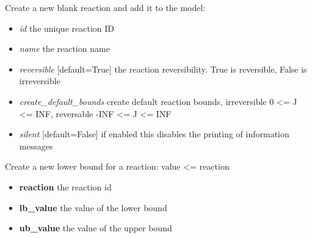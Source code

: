 \documentclass[a4paper,11pt,english]{sphinxmanual}
\begin{document}
\begin{fulllineitems}
\begin{fulllineitems}
\end{fulllineitems}


\begin{fulllineitems}
\label{modules_doc:cbmpy.CBModel.Model.createReaction}
Create a new blank reaction and add it to the model:
\begin{itemize}
\item {} 
\emph{id} the unique reaction ID

\item {} 
\emph{name} the reaction name

\item {} 
\emph{reversible} {[}default=True{]} the reaction reversibility. True is reversible, False is irreversible

\item {} 
\emph{create\_default\_bounds} create default reaction bounds, irreversible 0 \textless{}= J \textless{}= INF, reversable -INF \textless{}= J \textless{}= INF

\item {} 
\emph{silent} {[}default=False{]} if enabled this disables the printing of information messages

\end{itemize}

\end{fulllineitems}


\begin{fulllineitems}
\label{modules_doc:cbmpy.CBModel.Model.createReactionBounds}
Create a new lower bound for a reaction: value \textless{}= reaction
\begin{itemize}
\item {} 
\textbf{reaction} the reaction id

\item {} 
\textbf{lb\_value} the value of the lower bound

\item {} 
\textbf{ub\_value} the value of the upper bound

\end{itemize}


\end{fulllineitems}
\end{fulllineitems}
\end{document}
